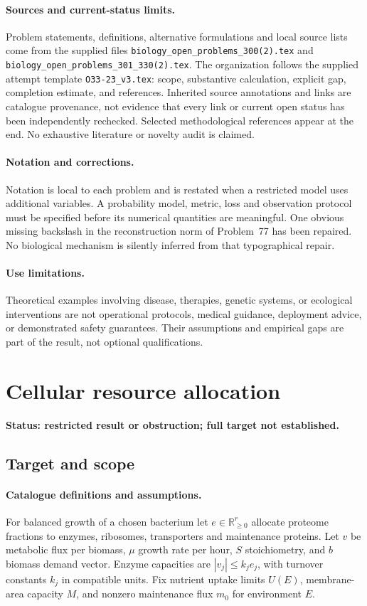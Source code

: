 \documentclass[11pt]{article}
\begin{document}
\paragraph{Sources and current-status limits.}
Problem statements, definitions, alternative formulations and local source lists
come from the supplied files
\texttt{biology\_open\_problems\_300(2).tex} and
\texttt{biology\_open\_problems\_301\_330(2).tex}.
The organization follows the supplied attempt template
\texttt{O33-23\_v3.tex}: scope, substantive calculation, explicit gap,
completion estimate, and references. Inherited source annotations and links are
catalogue provenance, not evidence that every link or current open status has
been independently rechecked. Selected methodological references appear at the
end. No exhaustive literature or novelty audit is claimed.

\paragraph{Notation and corrections.}
Notation is local to each problem and is restated when a restricted model uses
additional variables. A probability model, metric, loss and observation protocol
must be specified before its numerical quantities are meaningful. One obvious
missing backslash in the reconstruction norm of Problem~77 has been repaired.
No biological mechanism is silently inferred from that typographical repair.

\paragraph{Use limitations.}
Theoretical examples involving disease, therapies, genetic systems, or ecological
interventions are not operational protocols, medical guidance, deployment advice,
or demonstrated safety guarantees. Their assumptions and empirical gaps are part
of the result, not optional qualifications.


\section*{Cellular resource allocation}
\label{prob:055}
\noindent\textbf{Status: restricted result or obstruction; full target not established.}
\subsection{Target and scope}
\paragraph{Catalogue definitions and assumptions.}
For balanced growth of a chosen bacterium let $e\in\mathbb{R}_{\ge0}^r$ allocate proteome fractions to enzymes, ribosomes, transporters and maintenance proteins. Let $v$ be metabolic flux per biomass, $\mu$ growth rate per hour, $S$ stoichiometry, and $b$ biomass demand vector. Enzyme capacities are $|v_j|\le k_j e_j$, with turnover constants $k_j$ in compatible units. Fix nutrient uptake limits $U(E)$, membrane-area capacity $M$, and nonzero maintenance flux $m_0$ for environment $E$.
\end{document}
